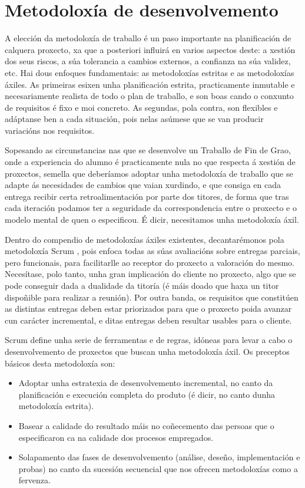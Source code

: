 \section{Metodoloxía de desenvolvemento}

A elección da metodoloxía de traballo é un paso importante na planificación de calquera proxecto, xa que a posteriori influirá en varios aspectos deste: a xestión dos seus riscos, a súa tolerancia a cambios externos, a confianza na súa validez, etc. Hai dous enfoques fundamentais: as metodoloxías estritas e as metodoloxías áxiles. As primeiras esixen unha planificación estrita, practicamente inmutable e necesariamente realista de todo o plan de traballo, e son boas cando o conxunto de requisitos é fixo e moi concreto. As segundas, pola contra, son flexibles e adáptanse ben a cada situación, pois nelas asúmese que se van producir variacións nos requisitos.

Sopesando as circunstancias nas que se desenvolve un Traballo de Fin de Grao, onde a experiencia do alumno é practicamente nula no que respecta á xestión de proxectos, semella que deberíamos adoptar unha metodoloxía de traballo que se adapte ás necesidades de cambios que vaian xurdindo, e que consiga en cada entrega recibir certa retroalimentación por parte dos titores, de forma que tras cada iteración podamos ter a seguridade da correspondencia entre o proxecto e o modelo mental de quen o especificou. É dicir, necesitamos unha metodoloxía áxil.

Dentro do compendio de metodoloxías áxiles existentes, decantarémonos pola metodoloxía Scrum \cite{scrum}, pois enfoca todas as súas avaliacións sobre entregas parciais, pero funcionais, para facilitarlle ao receptor do proxecto a valoración do mesmo. Necesítase, polo tanto, unha gran implicación do cliente no proxecto, algo que se pode conseguir dada a dualidade da titoría (é máis doado que haxa un titor dispoñible para realizar a reunión). Por outra banda, os requisitos que constitúen as distintas entregas deben estar priorizados para que o proxecto poida avanzar cun carácter incremental, e ditas entregas deben resultar usables para o cliente.

Scrum define unha serie de ferramentas e de regras, idóneas para levar a cabo o desenvolvemento de proxectos que buscan unha metodoloxía áxil. Os preceptos básicos desta metodoloxía son:

\begin{itemize}
\item Adoptar unha estratexia de desenvolvemento incremental, no canto da planificación e execución completa do produto (é dicir, no canto dunha metodoloxía estrita).
\item Basear a calidade do resultado máis no coñecemento das persoas que o especificaron ca na calidade dos procesos empregados.
\item Solapamento das fases de desenvolvemento (análise, deseño, implementación e probas) no canto da sucesión secuencial que nos ofrecen metodoloxías como a fervenza.
\end{itemize} 

